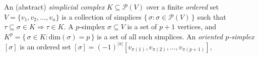 An (abstract) \emph{simplicial complex} $K \subseteq \mathcal{P}(V)$ over a finite \emph{ordered} set $V = \{v_1, v_2, \dots, v_n \}$ is a collection of simplices $\{\, \sigma : \sigma \in \mathcal{P}(V) \,\}$ such that $\tau \subseteq \sigma \in K \Rightarrow \tau \in K$.
A $p$-simplex $\sigma \subseteq V$ is a set of $p+1$ vertices, and $K^p = \{ \, \sigma \in K : \mathrm{dim}(\sigma) = p \, \}$ is a set of all such simplices. 
An \emph{oriented $p$-simplex} $[\sigma]$ is an ordered set $[\sigma] = (-1)^{\lvert \pi \rvert } \left [v_{\pi(1)}, v_{\pi(2)}, \dots, v_{\pi(p+1)} \right ]$,
